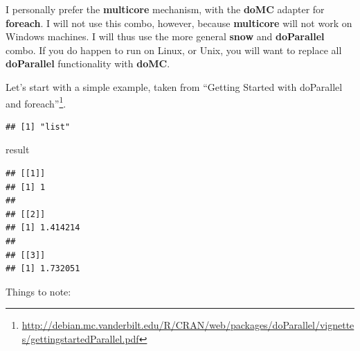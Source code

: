 \documentclass[]{book}
\newenvironment{Shaded}{\begin{snugshade}}{\end{snugshade}}
\newcommand{\DataTypeTok}[1]{\textcolor[rgb]{0.13,0.29,0.53}{#1}}
\newcommand{\DecValTok}[1]{\textcolor[rgb]{0.00,0.00,0.81}{#1}}
\newcommand{\KeywordTok}[1]{\textcolor[rgb]{0.13,0.29,0.53}{\textbf{#1}}}
\newcommand{\NormalTok}[1]{#1}
\newcommand{\OperatorTok}[1]{\textcolor[rgb]{0.81,0.36,0.00}{\textbf{#1}}}
\newcommand{\StringTok}[1]{\textcolor[rgb]{0.31,0.60,0.02}{#1}}
\renewcommand{\href}[2]{#2\footnote{\url{#1}}}
\theoremstyle{definition}
\theoremstyle{definition}
\theoremstyle{definition}
\theoremstyle{remark}
\let\BeginKnitrBlock\begin \let\EndKnitrBlock\end
\begin{document}
\BeginKnitrBlock{remark}
{}I personally prefer the \textbf{multicore} mechanism, with the \textbf{doMC} adapter for \textbf{foreach}.
I will not use this combo, however, because \textbf{multicore} will not work on Windows machines.
I will thus use the more general \textbf{snow} and \textbf{doParallel} combo.
If you do happen to run on Linux, or Unix, you will want to replace all \textbf{doParallel} functionality with \textbf{doMC}.
\EndKnitrBlock{remark}

Let's start with a simple example, taken from \href{http://debian.mc.vanderbilt.edu/R/CRAN/web/packages/doParallel/vignettes/gettingstartedParallel.pdf}{``Getting Started with doParallel and foreach''}.

\begin{Shaded}
\end{Shaded}

\begin{verbatim}
## [1] "list"
\end{verbatim}

\begin{Shaded}
\begin{Highlighting}[]
\NormalTok{result}
\end{Highlighting}
\end{Shaded}

\begin{verbatim}
## [[1]]
## [1] 1
## 
## [[2]]
## [1] 1.414214
## 
## [[3]]
## [1] 1.732051
\end{verbatim}

Things to note:
\end{document}
